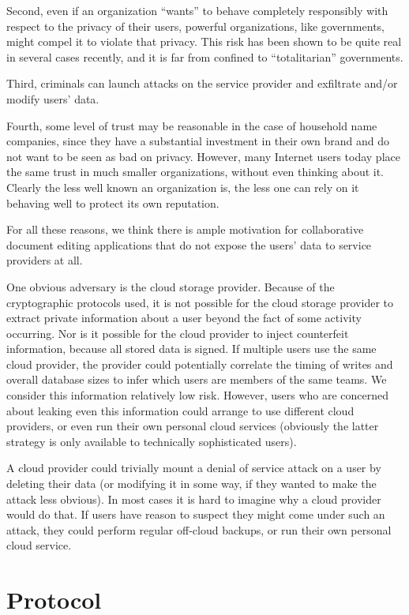 \documentclass[pldi,10pt,preprint]{sigplanconf-pldi16}
\begin{document}
Second, even if an organization ``wants'' to behave completely responsibly with respect to the privacy of their users, powerful organizations, like governments, might compel it to violate that privacy.
This risk has been shown to be quite real in several cases recently, and it is far from confined to ``totalitarian'' governments.

Third, criminals can launch attacks on the service provider and exfiltrate and/or modify users' data.

Fourth, some level of trust may be reasonable in the case of household name companies, since they have a substantial investment in their own brand and do not want to be seen as bad on privacy.
However, many Internet users today place the same trust in much smaller organizations, without even thinking about it.
Clearly the less well known an organization is, the less one can rely on it behaving well to protect its own reputation.

For all these reasons, we think there is ample motivation for collaborative document editing applications that do not expose the users' data to service providers at all.

One obvious adversary is the cloud storage provider.
Because of the cryptographic protocols used, it is not possible for the cloud storage provider to extract private information about a user beyond the fact of some activity occurring.
Nor is it possible for the cloud provider to inject counterfeit information, because all stored data is signed.
If multiple users use the same cloud provider, the provider could potentially correlate the timing of writes and overall database sizes to infer which users are members of the same teams.
We consider this information relatively low risk.
However, users who are concerned about leaking even this information could arrange to use different cloud providers, or even run their own personal cloud services (obviously the latter strategy is only available to technically sophisticated users).

A cloud provider could trivially mount a denial of service attack on a user by deleting their data (or modifying it in some way, if they wanted to make the attack less obvious).
In most cases it is hard to imagine why a cloud provider would do that.
If users have reason to suspect they might come under such an attack, they could perform regular off-cloud backups, or run their own personal cloud service.

\section{Protocol}
\end{document}
